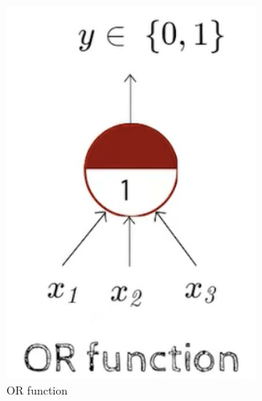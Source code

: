 \documentclass[a4paper]{article}
\begin{document}
\begin{itemize}
\begin{figure}[H]
\begin{subfigure}[b]{0.225\textwidth}
            \includegraphics[width=0.9\textwidth]{Degree//static/DL_Pitts_OR.png}
            \caption{OR function}
            \label{fig:DL-pitts-OR}
        \end{subfigure}
        \hfill
        \begin{subfigure}[b]{0.225\textwidth}
            \centering

\end{subfigure}
\end{figure}
\end{itemize}
\end{document}
